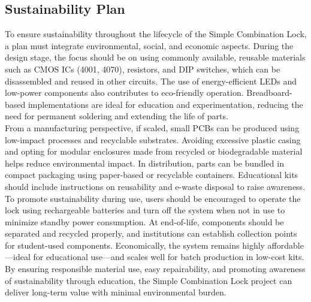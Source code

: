 \subsection{Sustainability Plan}
To ensure sustainability throughout the lifecycle of the Simple Combination Lock, a plan must integrate environmental, social, and economic aspects. During the design stage, the focus should be on using commonly available, reusable materials such as CMOS ICs (4001, 4070), resistors, and DIP switches, which can be disassembled and reused in other circuits. The use of energy-efficient LEDs and low-power components also contributes to eco-friendly operation. Breadboard-based implementations are ideal for education and experimentation, reducing the need for permanent soldering and extending the life of parts.\\
From a manufacturing perspective, if scaled, small PCBs can be produced using low-impact processes and recyclable substrates. Avoiding excessive plastic casing and opting for modular enclosures made from recycled or biodegradable material helps reduce environmental impact. In distribution, parts can be bundled in compact packaging using paper-based or recyclable containers. Educational kits should include instructions on reusability and e-waste disposal to raise awareness.\\
To promote sustainability during use, users should be encouraged to operate the lock using rechargeable batteries and turn off the system when not in use to minimize standby power consumption. At end-of-life, components should be separated and recycled properly, and institutions can establish collection points for student-used components. Economically, the system remains highly affordable—ideal for educational use—and scales well for batch production in low-cost kits. By ensuring responsible material use, easy repairability, and promoting awareness of sustainability through education, the Simple Combination Lock project can deliver long-term value with minimal environmental burden.\cite{4.1.4}


